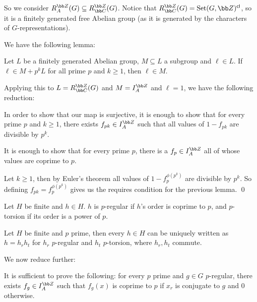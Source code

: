 So we consider $R^\bZ_A(G)\subseteq R^\bZ_\bC(G)$.
Notice that $R^\bZ_\bC(G)=\St(G,\bZ)^\cl$, so it is a finitely generated free Abelian group (as it is generated by the characters of $G$-representations).

We have the following lemma:

\blemm

    Let $L$ be a finitely generated Abelian group, $M\subseteq L$ a subgroup and $\ell\in L$.
    If $\ell\in M+p^kL$ for all prime $p$ and $k\geq1$, then $\ell\in M$.

\elemm

Applying this to $L=R^\bZ_\bC(G)$ and $M=I^\bZ_A$ and $\ell=1$, we have the following reduction:

\blemm

    In order to show that our map is surjective, it is enough to show that for every prime $p$ and $k\geq1$, there exists $f_{pk}\in I^\bZ_A$ such that all values
    of $1-f_{pk}$ are divisible by $p^k$.

\elemm

\blemm

    It is enough to show that for every prime $p$, there is a $f_p\in I^\bZ_A$ all of whose values are coprime to $p$.

\elemm

\bproof

    Let $k\geq1$, then by Euler's theorem all values of $1-f_p^{\phi(p^k)}$ are divisible by $p^k$.
    So defining $f_{pk}=f_p^{\phi(p^k)}$ gives us the requires condition for the previous lemma.
    \qed

\eproof

\bdefn

    Let $H$ be finite and $h\in H$.
    $h$ is {\emphcolor $p$-regular} if $h$'s order is coprime to $p$, and {\emphcolor $p$-torsion} if its order is a power of $p$.

\edefn

\blemm

    Let $H$ be finite and $p$ prime, then every $h\in H$ can be uniquely written as $h=h_rh_t$ for $h_r$ $p$-regular and $h_t$ $p$-torsion, where $h_r,h_t$ commute.

\elemm

We now reduce further:

\blemm

    It is sufficient to prove the following: for every $p$ prime and $g\in G$ $p$-regular, there exists $f_g\in I^\bZ_A$ such that $f_g(x)$ is coprime to $p$
    if $x_r$ is conjugate to $g$ and $0$ otherwise.

